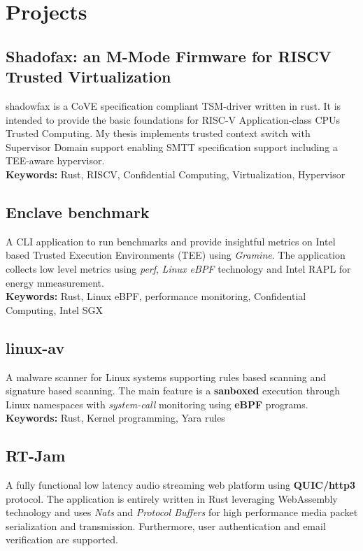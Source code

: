 \documentclass[11pt,a4paper]{article}
\begin{document}
  \section{Projects}
  \subsection{Shadofax: an M-Mode Firmware for RISCV Trusted Virtualization \href{https://github.com/Granp4sso/shadowfax} {\faGithub}}
  shadowfax is a CoVE specification compliant TSM-driver written in rust. It is intended to provide the basic foundations for RISC-V Application-class CPUs Trusted Computing. 
  My thesis implements trusted context switch with Supervisor Domain support enabling SMTT specification support including a TEE-aware hypervisor.\\

  \textbf{Keywords:} Rust, RISCV, Confidential Computing, Virtualization, Hypervisor

  \subsection{Enclave benchmark \href{https://github.com/alarmfox/enclave-benchmark} {\faGithub}}
  A CLI application to run benchmarks and provide insightful metrics on Intel based Trusted Execution Environments (TEE) using \textit{Gramine}. The application collects low level metrics using \textit{perf}, \textit{Linux eBPF} technology and Intel RAPL for energy mmeasurement. \\

  \textbf{Keywords:} Rust, Linux eBPF, performance monitoring, Confidential Computing, Intel SGX

  \subsection{linux-av \href{https://github.com/alarmfox/linux-av}{\faGithub}}
  A malware scanner for Linux systems supporting rules based scanning and signature based scanning. The main feature is a \textbf{sanboxed} execution through Linux namespaces with \textit{system-call} monitoring using \textbf{eBPF} programs.\\

  \textbf{Keywords:} Rust, Kernel programming, Yara rules 
  
  \subsection{RT-Jam \href{https://github.com/alarmfox/rt-jam}{\faGithub}}
  A fully functional low latency audio streaming web platform using \textbf{QUIC/http3} protocol. The application is entirely written in Rust leveraging WebAssembly technology and uses \textit{Nats} and \textit{Protocol Buffers} for high performance media packet serialization and transmission. Furthermore, user authentication and email verification are supported. \\
\end{document}
